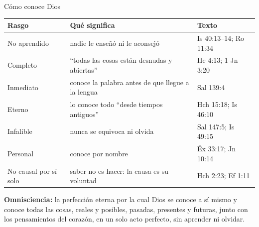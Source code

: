 \documentclass[hyperref={bookmarks=false},aspectratio=169]{beamer}
\begin{document}
\begin{frame}{Cómo conoce Dios}
\scriptsize\renewcommand{\arraystretch}{1.2}
\begin{tabular}{@{}>{\RaggedRight\arraybackslash}p{2.4cm}>{\RaggedRight\arraybackslash}p{6.0cm}>{\RaggedRight\arraybackslash}p{3.4cm}@{}}
\toprule
\textbf{Rasgo} & \textbf{Qué significa} & \textbf{Texto} \\ \midrule
No aprendido & nadie le enseñó ni le aconsejó & Is 40:13--14; Ro 11:34 \\
Completo & ``todas las cosas están desnudas y abiertas'' & He 4:13; 1 Jn 3:20 \\
Inmediato & conoce la palabra antes de que llegue a la lengua & Sal 139:4 \\
Eterno & lo conoce todo ``desde tiempos antiguos'' & Hch 15:18; Is 46:10 \\
Infalible & nunca se equivoca ni olvida & Sal 147:5; Is 49:15 \\
Personal & conoce por nombre & Éx 33:17; Jn 10:14 \\
No causal por sí solo & saber no es hacer: la causa es su voluntad & Hch 2:23; Ef 1:11 \\
\bottomrule
\end{tabular}\par\medskip
\begin{tcolorbox}[colback=papiro,colframe=azul,boxrule=1pt,arc=3pt]
\small\textbf{Omnisciencia:} la perfección eterna por la cual Dios se conoce a sí mismo y conoce todas las cosas, reales y posibles, pasadas, presentes y futuras, junto con los pensamientos del corazón, en un solo acto perfecto, sin aprender ni olvidar.
\end{tcolorbox}
\end{frame}
\end{document}
